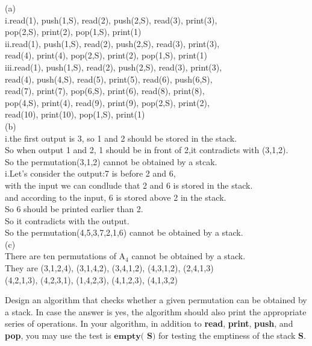 \documentclass[11pt, a4paper, UTF8]{ctexart}
\begin{document}
\begin{solution}
(a)\\
\indent \noindent i.read(1), push(1,S), read(2), push(2,S), read(3), print(3),\\
 pop(2,S), print(2), pop(1,S), print(1)\\
\indent \noindent ii.read(1), push(1,S), read(2), push(2,S), read(3), print(3),\\
 read(4), print(4), pop(2,S), print(2), pop(1,S), print(1)\\

\indent \noindent iii.read(1), push(1,S), read(2), push(2,S), read(3), print(3),\\
read(4), push(4,S), read(5), print(5), read(6), push(6,S),\\
read(7), print(7), pop(6,S), print(6), read(8), print(8),\\
pop(4,S), print(4), read(9), print(9), pop(2,S), print(2),\\
read(10), print(10), pop(1,S), print(1)\\
(b)\\
\indent \noindent i.the first output is 3, so 1 and 2 should be stored in the stack.\\
 So when output 1 and 2, 1 should be in front of 2,it contradicts with (3,1,2).\\
 So the permutation(3,1,2) cannot be obtained by a stcak.\\
 \indent \noindent i.Let's consider the output:7 is before 2 and 6,\\
 with the input we can condlude that 2 and 6 is stored in the stack.\\
 and according to the input, 6 is stored above 2 in the stack.\\
 So 6 should be printed earlier than 2.\\
 So it contradicts with the output.\\
 So the permutation(4,5,3,7,2,1,6) cannot be obtained by a stack.\\
 (c)\\
 \indent \noindent There are ten permutations of A$_4$ cannot be obtained by a stack.\\
 They are (3,1,2,4), (3,1,4,2), (3,4,1,2), (4,3,1,2), (2,4,1,3)\\
 (4,2,1,3), (4,2,3,1), (1,4,2,3), (4,1,2,3), (4,1,3,2)
\end{solution}


\begin{problem}[DH: 2.13]
Design an algorithm that checks whether a given permutation can be obtained by a stack. In
case the answer is yes, the algorithm should also print the appropriate series of operations.
In your algorithm, in addition to \textbf{read}, \textbf{print}, \textbf{push}, and \textbf{pop}, you may use the test is \(\textbf{empty(
S)}\) for testing the emptiness of the stack \textbf{S}.
\end{problem}
\end{document}
